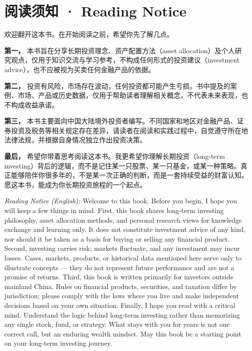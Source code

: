 \documentclass[a4paper,11pt,oneside,fontset=none,UTF8,zihao=-4]{ctexbook}
\begin{document}
\newpage

\chapter{阅读须知 · Reading
Notice}\label{ux9605ux8bfbux987bux77e5-reading-notice}

\begin{dhquote}
欢迎翻开这本书。在开始阅读之前，希望你先了解几点。
\end{dhquote}

\textbf{第一，} 本书旨在分享长期投资理念、资产配置方法（asset
allocation）及个人研究观点，仅用于知识交流与学习参考，不构成任何形式的投资建议（investment
advice），也不应被视为买卖任何金融产品的依据。

\textbf{第二，}
投资有风险，市场存在波动，任何投资都可能产生亏损。书中提及的案例、市场、产品或历史数据，仅用于帮助读者理解相关概念，不代表未来表现，也不构成收益承诺。

\textbf{第三，}
本书主要面向中国大陆境外投资者编写。不同国家和地区对金融产品、证券投资及税务等相关规定存在差异，请读者在阅读和实践过程中，自觉遵守所在地法律法规，并根据自身情况独立作出投资决策。

\textbf{最后，}
希望你带着思考阅读这本书。我更希望你理解长期投资（long-term
investing）背后的逻辑，而不是记住某一只股票、某一只基金，或某一种策略。真正能够陪伴你很多年的，不是某一次正确的判断，而是一套持续受益的财富认知。愿这本书，能成为你长期投资旅程的一个起点。

\begin{dhquote}
\emph{Reading Notice (English):} Welcome to this book. Before you begin,
I hope you will keep a few things in mind. First, this book shares
long-term investing philosophy, asset allocation methods, and personal
research views for knowledge exchange and learning only. It does not
constitute investment advice of any kind, nor should it be taken as a
basis for buying or selling any financial product. Second, investing
carries risk; markets fluctuate, and any investment may incur losses.
Cases, markets, products, or historical data mentioned here serve only
to illustrate concepts --- they do not represent future performance and
are not a promise of returns. Third, this book is written primarily for
investors outside mainland China. Rules on financial products,
securities, and taxation differ by jurisdiction; please comply with the
laws where you live and make independent decisions based on your own
situation. Finally, I hope you read with a critical mind. Understand the
logic behind long-term investing rather than memorizing any single
stock, fund, or strategy. What stays with you for years is not one
correct call, but an enduring wealth mindset. May this book be a
starting point on your long-term investing journey.
\end{dhquote}
\end{document}
